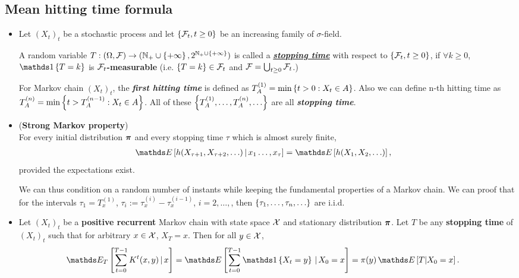 \documentclass[11pt]{article}
\begin{document}
\subsection{Mean hitting time formula}
\begin{itemize}
\item \begin{definition}
Let $(X_t)_t$ be a stochastic process and let $\left\{{\mathcal F}_{t}, t\ge 0\right\}$ be an increasing family of $\sigma$-field. 

A random variable $T: (\Omega, {\mathcal F}) \rightarrow ({\mathbb N}_{+}\cup\left\{+\infty\right\}, 2^{{\mathbb N}_{+}\cup\left\{+\infty\right\}})$ is called a \underline{\textbf{\emph{stopping time}}} with respect to $\left\{{\mathcal F}_{t}, t\ge 0\right\}$, if $\forall k \ge 0$, $\ind{T = k}$ is \textbf{${\mathcal F}_{t}$-measurable} (i.e. $\left\{T = k\right\} \in {\mathcal F}_{t}$ and ${\mathcal F} = \bigcup_{t\ge 0} {\mathcal F}_t$.)
\end{definition}

For Markov chain $(X_t)_t$, the \emph{\textbf{first hitting time}} is defined as $T_{A}^{(1)} = \min\left\{t > 0: X_t \in A\right\}$. Also we can define n-th hitting time as $T_{A}^{(n)} = \min\left\{t > T_{A}^{(n-1)}: X_t \in A\right\}$. All of these $\left\{T_{A}^{(1)}, \ldots, T_{A}^{(n)}, \ldots \right\}$ are all \emph{\textbf{stopping time}}. 

\item \begin{theorem}(\textbf{Strong Markov property}) \citep{robert1999monte}\\
For every initial distribution $\boldsymbol{\pi}$ and every stopping time $\tau$ which is almost surely finite,
\begin{align}
\E{}{h(X_{\tau+1},X_{\tau+2},\ldots)\,|\,x_{1}\ldots,x_{\tau}} &= \E{}{h(X_1 ,X_2, \ldots )}, \label{eqn: mc_strong_markov}
\end{align} provided the expectations exist.
\end{theorem} We can thus condition on a random number of instants while keeping the fundamental properties of a Markov chain.
We can proof that for the intervals $\tau_1 = T_{x}^{(1)}$, $\tau_{i} := \tau_{x}^{(i)} - \tau_{x}^{(i-1)}$, $i=2,\ldots,$, then $\left\{\tau_1,\ldots, \tau_n,\ldots\right\}$ are i.i.d.
\item 
\begin{theorem}
Let $(X_t)_t$ be a \textbf{positive recurrent} Markov chain with state space ${\mathcal X}$ and stationary distribution $\boldsymbol{\pi}$. Let $T$ be any \textbf{stopping time} of $(X_t)_t$ such that for arbitrary $x \in {\mathcal X}$, $X_{T} = x$. Then for all $y \in {\mathcal X}$, 
\begin{align}
\E{T}{\sum_{t=0}^{T-1}K^{t}(x,y)\,|\,x} = \E{}{\sum_{t=0}^{T-1}\ind{X_{t} = y}\,|\,X_0 = x} &= \pi(y)\,\E{}{T | X_{0} = x}. \label{eqn: stopping_time_pos_recur}
\end{align}
\end{theorem}


\end{itemize}
\end{document}
